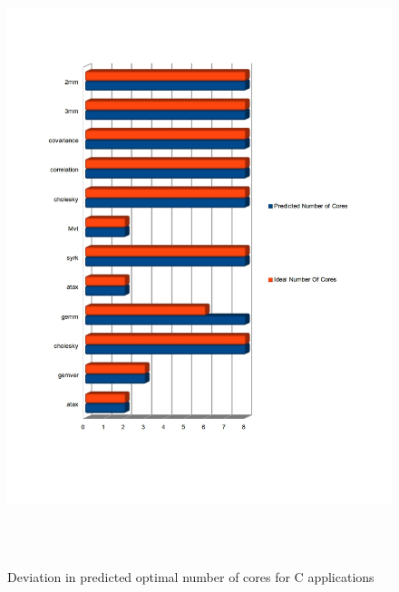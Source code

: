 \documentclass[diploma]{Styles/softlab-thesis}
\begin{document}
\begin{figure}[ht!]
\begin{center}
\includegraphics[width=160mm, height=180mm]{images/core-errors-C.jpg}
\caption{Deviation in predicted optimal number of cores for C applications \label{overflow}}
\end{center}
\end{figure}
\end{document}
